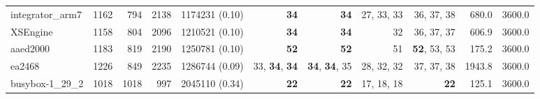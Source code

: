 \begin{table*}
\begin{tiny}
{\begin{tabular}{lrrrrrrrrrr}
integrator\_arm7 & \num[text-series-to-math=true]{1162} & \num[text-series-to-math=true]{794} & \num[text-series-to-math=true]{2138} & \num[text-series-to-math=true]{1174231} (\num[text-series-to-math=true]{0.10}) & \textbf{\num[text-series-to-math=true]{34}} & \textbf{\num[text-series-to-math=true]{34}} & \num[text-series-to-math=true]{27}, \num[text-series-to-math=true]{33}, \num[text-series-to-math=true]{33} & \num[text-series-to-math=true]{36}, \num[text-series-to-math=true]{37}, \num[text-series-to-math=true]{38} & 680.0 & 3600.0\\
XSEngine & \num[text-series-to-math=true]{1158} & \num[text-series-to-math=true]{804} & \num[text-series-to-math=true]{2096} & \num[text-series-to-math=true]{1210521} (\num[text-series-to-math=true]{0.10}) & \textbf{\num[text-series-to-math=true]{34}} & \textbf{\num[text-series-to-math=true]{34}} & \num[text-series-to-math=true]{32} & \num[text-series-to-math=true]{36}, \num[text-series-to-math=true]{37}, \num[text-series-to-math=true]{37} & 606.9 & 3600.0\\
aaed2000 & \num[text-series-to-math=true]{1183} & \num[text-series-to-math=true]{819} & \num[text-series-to-math=true]{2190} & \num[text-series-to-math=true]{1250781} (\num[text-series-to-math=true]{0.10}) & \textbf{\num[text-series-to-math=true]{52}} & \textbf{\num[text-series-to-math=true]{52}} & \num[text-series-to-math=true]{51} & \textbf{\num[text-series-to-math=true]{52}}, \num[text-series-to-math=true]{53}, \num[text-series-to-math=true]{53} & 175.2 & 3600.0\\
ea2468 & \num[text-series-to-math=true]{1226} & \num[text-series-to-math=true]{849} & \num[text-series-to-math=true]{2235} & \num[text-series-to-math=true]{1286744} (\num[text-series-to-math=true]{0.09}) & \num[text-series-to-math=true]{33}, \textbf{\num[text-series-to-math=true]{34}}, \textbf{\num[text-series-to-math=true]{34}} & \textbf{\num[text-series-to-math=true]{34}}, \textbf{\num[text-series-to-math=true]{34}}, \num[text-series-to-math=true]{35} & \num[text-series-to-math=true]{28}, \num[text-series-to-math=true]{32}, \num[text-series-to-math=true]{32} & \num[text-series-to-math=true]{37}, \num[text-series-to-math=true]{37}, \num[text-series-to-math=true]{38} & 1943.8 & 3600.0\\
busybox-1\_29\_2 & \num[text-series-to-math=true]{1018} & \num[text-series-to-math=true]{1018} & \num[text-series-to-math=true]{997} & \num[text-series-to-math=true]{2045110} (\num[text-series-to-math=true]{0.34}) & \textbf{\num[text-series-to-math=true]{22}} & \textbf{\num[text-series-to-math=true]{22}} & \num[text-series-to-math=true]{17}, \num[text-series-to-math=true]{18}, \num[text-series-to-math=true]{18} & \textbf{\num[text-series-to-math=true]{22}} & 125.1 & 3600.0\\

\end{tabular}}
\end{tiny}
\end{table*}

